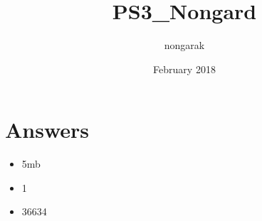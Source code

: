 \documentclass{article}
\title{PS3_Nongard}
\author{nongarak }
\date{February 2018}
\begin{document}
\maketitle

\section{Answers}
\begin{itemize}
    \item 5mb
    \item 1
    \item 36634
\end{itemize}
\end{document}
